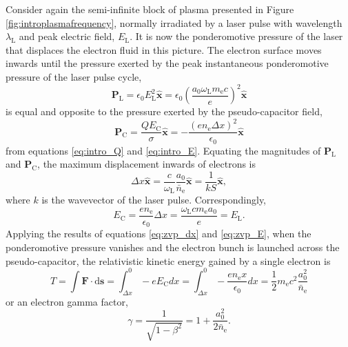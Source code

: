 Consider again the semi-infinite block of plasma presented in Figure \ref{fig:introplasmafrequency}, normally irradiated by a laser pulse with wavelength $\lambda_\mathrm{L}$ and peak electric field, $E_\mathrm{L}$. It is now the ponderomotive pressure of the laser that displaces the electron fluid in this picture. The electron surface moves inwards until the pressure exerted by the peak instantaneous ponderomotive pressure of the laser pulse cycle,
\begin{equation}
	\mathbf{P}_\mathrm{L} = \epsilon_0 E^2_\mathrm{L} \hat{\mathbf{x}} = \epsilon_0 \left(\frac{a_0\omega_\mathrm{L}m_\mathrm{e}c}{e}\right)^2 \hat{\mathbf{x}}
\end{equation}
is equal and opposite to the pressure exerted by the pseudo-capacitor field,
\begin{equation}
	\mathbf{P}_\mathrm{C} = \frac{QE_\mathrm{C}}{\sigma} \hat{\mathbf{x}}= -\frac{(en_\mathrm{e}\Delta x)^2}{\epsilon_0}\hat{\mathbf{x}}
\end{equation} 
from equations \ref{eq:intro_Q} and \ref{eq:intro_E}. Equating the magnitudes of $\mathbf{P}_\mathrm{L}$ and $\mathbf{P}_\mathrm{C}$, the maximum displacement inwards of electrons is
\begin{equation}\label{eq:zvp_dx}
	\Delta x \hat{\mathbf{x}} = \frac{c}{\omega_\mathrm{L}}\frac{a_0}{\bar{n}_\mathrm{e}}\hat{\mathbf{x}}  = \frac{1}{kS}\hat{\mathbf{x}},
\end{equation}
where $k$ is the wavevector of the laser pulse. Correspondingly,
\begin{equation}\label{eq:zvp_E}
	E_\mathrm{C} = \frac{en_\mathrm{e}}{\epsilon_0}\Delta x = \frac{\omega_\mathrm{L}cm_\mathrm{e}a_0}{e} = E_\mathrm{L}.
\end{equation}
Applying the results of equations \ref{eq:zvp_dx} and \ref{eq:zvp_E}, when the ponderomotive pressure vanishes and the electron bunch is launched across the pseudo-capacitor, the relativistic kinetic energy gained by a single electron is
\begin{equation}\label{eq:zvp_T}
	T =  \int \mathbf{F}\cdot\mathrm{d}\mathbf{s} = \int^0_{\Delta x} -eE_\mathrm{C}dx = \int^0_{\Delta x}-\frac{en_\mathrm{e}x}{\epsilon_0}dx = \frac{1}{2}m_\mathrm{e}c^2\frac{a^2_0}{\bar{n}_\mathrm{e}}
\end{equation}
or an electron gamma factor,
\begin{equation}\label{eq:zvp_gamma}
	\gamma = \frac{1}{\sqrt{1-\beta^2}} = 1 + \frac{a_0^2}{2\bar{n}_\mathrm{e}}.
\end{equation}
